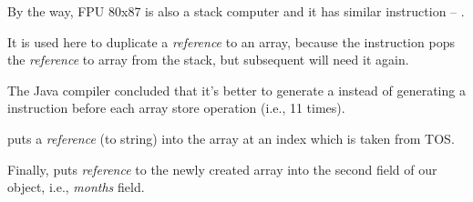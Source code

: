 By the way, FPU 80x87 is also a stack computer and it has similar instruction -- .


It is used here to duplicate a \emph{reference} to an array, because the  instruction pops
the \emph{reference} to array from the stack, but subsequent  will need it again.

The Java compiler concluded that it's better to generate a  instead of generating 
a  instruction before each array store operation (i.e., 11 times).


 puts a \emph{reference} (to string) into the array at an index which is 
taken from \ac{TOS}.


Finally,  puts \emph{reference} to the newly created array into the second field 
of our object, i.e., \emph{months} field.

